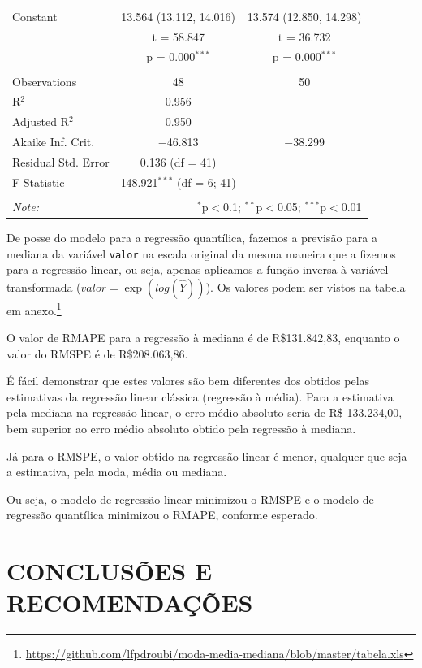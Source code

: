 \documentclass[a4paper, 12pt]{article}
\let\rmarkdownfootnote\footnote%
\def\footnote{\protect\rmarkdownfootnote}
\begin{document}
\begin{table}[!htbp]
\begin{tabular}{@{\extracolsep{5pt}}lcc}
  Constant & 13.564 (13.112, 14.016) & 13.574 (12.850, 14.298) \\ 
  & t = 58.847 & t = 36.732 \\ 
  & p = 0.000$^{***}$ & p = 0.000$^{***}$ \\ 
 \hline \\[-1.8ex] 
Observations & 48 & 50 \\ 
R$^{2}$ & 0.956 &  \\ 
Adjusted R$^{2}$ & 0.950 &  \\ 
Akaike Inf. Crit. & $-$46.813 & $-$38.299 \\ 
Residual Std. Error & 0.136 (df = 41) &  \\ 
F Statistic & 148.921$^{***}$ (df = 6; 41) &  \\ 
\hline 
\hline \\[-1.8ex] 
\textit{Note:}  & \multicolumn{2}{r}{$^{*}$p$<$0.1; $^{**}$p$<$0.05; $^{***}$p$<$0.01} \\ 
\end{tabular} 
\end{table}

De posse do modelo para a regressão quantílica, fazemos a previsão para
a mediana da variável \texttt{valor} na escala original da mesma maneira
que a fizemos para a regressão linear, ou seja, apenas aplicamos a
função inversa à variável transformada (\(valor = \exp(log(\hat{Y}))\)).
Os valores podem ser vistos na tabela em anexo.\footnote{\url{https://github.com/lfpdroubi/moda-media-mediana/blob/master/tabela.xls}}

O valor de RMAPE para a regressão à mediana é de R\$131.842,83, enquanto
o valor do RMSPE é de R\$208.063,86.

É fácil demonstrar que estes valores são bem diferentes dos obtidos
pelas estimativas da regressão linear clássica (regressão à média). Para
a estimativa pela mediana na regressão linear, o erro médio absoluto
seria de R\$ 133.234,00, bem superior ao erro médio absoluto obtido pela
regressão à mediana.

Já para o RMSPE, o valor obtido na regressão linear é menor, qualquer
que seja a estimativa, pela moda, média ou mediana.

Ou seja, o modelo de regressão linear minimizou o RMSPE e o modelo de
regressão quantílica minimizou o RMAPE, conforme esperado.

\section{CONCLUSÕES E RECOMENDAÇÕES}\label{conclusoes-e-recomendacoes}
\end{document}

